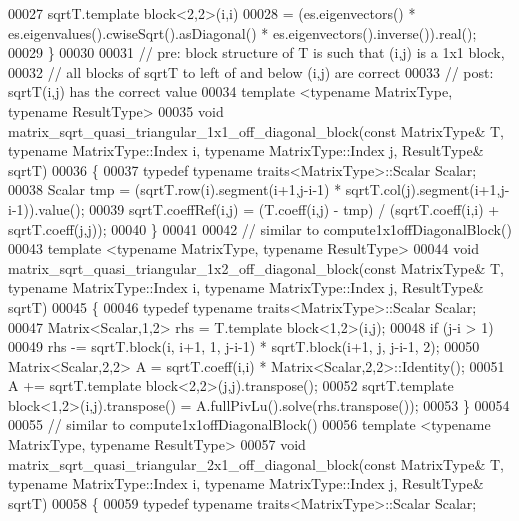 \begin{DoxyCode}
00027   sqrtT.template block<2,2>(i,i)
00028     = (es.eigenvectors() * es.eigenvalues().cwiseSqrt().asDiagonal() * es.eigenvectors().inverse()).real();
00029 \}
00030 
00031 \textcolor{comment}{// pre:  block structure of T is such that (i,j) is a 1x1 block,}
00032 \textcolor{comment}{//       all blocks of sqrtT to left of and below (i,j) are correct}
00033 \textcolor{comment}{// post: sqrtT(i,j) has the correct value}
00034 \textcolor{keyword}{template} <\textcolor{keyword}{typename} MatrixType, \textcolor{keyword}{typename} ResultType>
00035 \textcolor{keywordtype}{void} matrix\_sqrt\_quasi\_triangular\_1x1\_off\_diagonal\_block(\textcolor{keyword}{const} MatrixType& T, \textcolor{keyword}{typename} MatrixType::Index i,
       \textcolor{keyword}{typename} MatrixType::Index j, ResultType& sqrtT)
00036 \{
00037   \textcolor{keyword}{typedef} \textcolor{keyword}{typename} traits<MatrixType>::Scalar Scalar;
00038   Scalar tmp = (sqrtT.row(i).segment(i+1,j-i-1) * sqrtT.col(j).segment(i+1,j-i-1)).value();
00039   sqrtT.coeffRef(i,j) = (T.coeff(i,j) - tmp) / (sqrtT.coeff(i,i) + sqrtT.coeff(j,j));
00040 \}
00041 
00042 \textcolor{comment}{// similar to compute1x1offDiagonalBlock()}
00043 \textcolor{keyword}{template} <\textcolor{keyword}{typename} MatrixType, \textcolor{keyword}{typename} ResultType>
00044 \textcolor{keywordtype}{void} matrix\_sqrt\_quasi\_triangular\_1x2\_off\_diagonal\_block(\textcolor{keyword}{const} MatrixType& T, \textcolor{keyword}{typename} MatrixType::Index i,
       \textcolor{keyword}{typename} MatrixType::Index j, ResultType& sqrtT)
00045 \{
00046   \textcolor{keyword}{typedef} \textcolor{keyword}{typename} traits<MatrixType>::Scalar Scalar;
00047   Matrix<Scalar,1,2> rhs = T.template block<1,2>(i,j);
00048   \textcolor{keywordflow}{if} (j-i > 1)
00049     rhs -= sqrtT.block(i, i+1, 1, j-i-1) * sqrtT.block(i+1, j, j-i-1, 2);
00050   Matrix<Scalar,2,2> A = sqrtT.coeff(i,i) * Matrix<Scalar,2,2>::Identity();
00051   A += sqrtT.template block<2,2>(j,j).transpose();
00052   sqrtT.template block<1,2>(i,j).transpose() = A.fullPivLu().solve(rhs.transpose());
00053 \}
00054 
00055 \textcolor{comment}{// similar to compute1x1offDiagonalBlock()}
00056 \textcolor{keyword}{template} <\textcolor{keyword}{typename} MatrixType, \textcolor{keyword}{typename} ResultType>
00057 \textcolor{keywordtype}{void} matrix\_sqrt\_quasi\_triangular\_2x1\_off\_diagonal\_block(\textcolor{keyword}{const} MatrixType& T, \textcolor{keyword}{typename} MatrixType::Index i,
       \textcolor{keyword}{typename} MatrixType::Index j, ResultType& sqrtT)
00058 \{
00059   \textcolor{keyword}{typedef} \textcolor{keyword}{typename} traits<MatrixType>::Scalar Scalar;

\end{DoxyCode}
